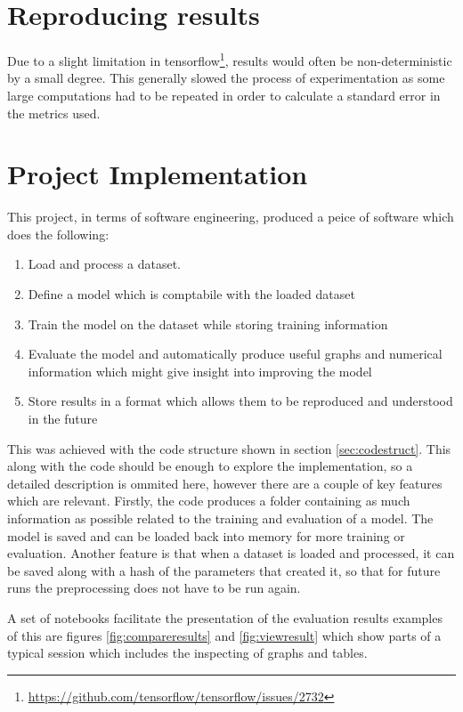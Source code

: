   \section{Reproducing results} \label{sec:GPU}
    Due to a slight limitation in tensorflow\footnote{\url{https://github.com/tensorflow/tensorflow/issues/2732}}, results would often be non-deterministic by a small degree. This generally slowed
    the process of experimentation as some large computations had to be repeated in order to calculate a standard error in the metrics used.
  \section{Project Implementation}
    This project, in terms of software engineering, produced a peice of software which does the following:
    \begin{enumerate}
      \item Load and process a dataset.
      \item Define a model which is comptabile with the loaded dataset
      \item Train the model on the dataset while storing training information
      \item Evaluate the model and automatically produce useful graphs and numerical information which might give insight into improving the model
      \item Store results in a format which allows them to be reproduced and understood in the future
    \end{enumerate}

    This was achieved with the code structure shown in section \ref{sec:codestruct}.
    This along with the code should be enough to explore the implementation, so a detailed
    description is ommited here, however there are a couple of key features which are
    relevant. Firstly, the code produces a folder containing as much information as possible
    related to the training and evaluation of a model. The model is saved and can be loaded back into
    memory for more training or evaluation. Another feature is that when a dataset is loaded and processed, it can be
    saved along with a hash of the parameters that created it, so that for future runs the preprocessing does not have to be run again.

    A set of notebooks facilitate the presentation of the evaluation results examples of this are figures \ref{fig:compareresults} and \ref{fig:viewresult} which show parts of a typical session which includes the inspecting of graphs and tables.

